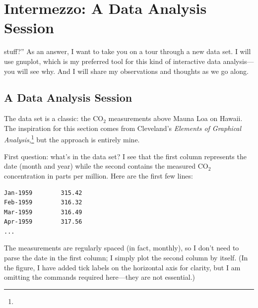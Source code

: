 

\chapter{Intermezzo: A Data Analysis Session}{}{}
\label{ch:session}
  
   
 stuff?'' As an answer, I want to take
you on a tour through a new data set. I will use gnuplot,  which is my
preferred tool for this kind of interactive data analysis---you will
see why. And I will share my observations and thoughts as we go along.

\section{A Data Analysis Session}
    
The data set is a classic: the $\mathrm{CO_2}$ measurements above
Mauna Loa on Hawaii.  The inspiration for this section comes from
Cleveland's \emph{Elements of Graphical Analysis},\footnote{} but the approach is entirely
mine.
    
First question: what's in the data set? I see that the first column
represents the date (month and year) while the second contains the
measured $\mathrm{CO_2}$ concentration in parts per million. Here are
the first few lines:

\begin{verbatim}
Jan-1959        315.42
Feb-1959        316.32
Mar-1959        316.49
Apr-1959        317.56
...
\end{verbatim}

The measurements are regularly spaced (in fact, monthly), so I don't
need to parse the date in the first column; I simply\vadjust{\pagebreak} plot the second
column by itself. (In the figure, I have added tick labels on the
horizontal axis for clarity, but I am omitting the commands required
here---they are not essential.)

